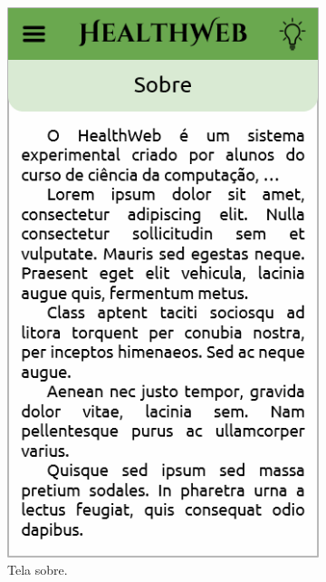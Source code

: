 \begin{figure}[htbp]
\begin{subfigure}{0.24\linewidth}
		\includegraphics[width=\linewidth]{figure/prototype/mobile/about.png}
		\caption{Tela sobre.}
		\label{fig:mobile:about}
	\end{subfigure}
	\hfill
	\begin{subfigure}{0.24\linewidth}
		\centering

\end{subfigure}
\end{figure}
